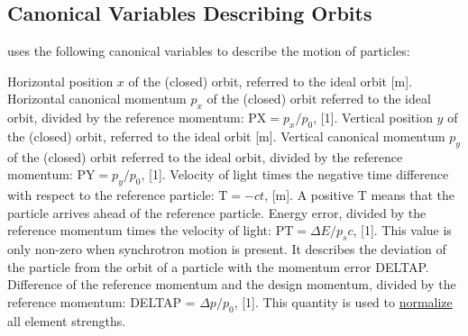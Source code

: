 \subsection{Canonical Variables Describing Orbits}
\label{subsec:tables_canon}
\madx uses the following canonical variables to describe the motion of particles: 
\begin{5.02.05}
\begin{madlist}
    Horizontal position $x$ of the (closed) orbit,
     referred to the ideal orbit [m].    
    Horizontal canonical momentum $p_x$ of the
     (closed) orbit referred to the ideal orbit, divided by the
     reference momentum: $\textrm{PX} = p_x / p_0$, [1].   
    Vertical position $y$ of the (closed) orbit, referred
     to the ideal orbit [m].   
    Vertical canonical momentum $p_y$ of the (closed)
     orbit referred to the ideal orbit, divided by the reference
     momentum: $\textrm{PY} = p_y / p_0$, [1].   
    Velocity of light times the negative time difference with
     respect to the reference particle: $\textrm{T} =  - c t$, [m]. A
     positive T means that the particle arrives ahead of the reference
     particle.   
    Energy error, divided by the reference momentum times the
     velocity of light: $\textrm{PT} = \Delta E / p_s c$, [1]. 
     This value is only non-zero when synchrotron motion is
     present. It describes the deviation of the particle from the orbit
     of a particle with the momentum error DELTAP.   
    Difference of the reference momentum and the design
     momentum, divided by the reference momentum: DELTAP =
     $\Delta p / p_0$, [1]. This quantity is used to
     \hyperref[chap:differences]{normalize} all element strengths.   
\end{madlist} 
\end{5.02.05}

